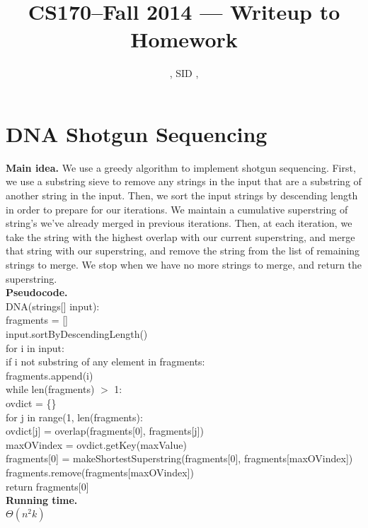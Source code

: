 \documentclass[11pt]{article}
\title{CS170--Fall 2014 --- Writeup to Homework \Homework}
\author{\Name, SID \SID, \texttt{\Login}}
\begin{document}
\maketitle


\section*{DNA Shotgun Sequencing}
\noindent
\textbf{Main idea.}
We use a greedy algorithm to implement shotgun sequencing. First, we use a substring sieve to remove any strings in the input that are a substring of another string in the input. Then, we sort the input strings by descending length in order to prepare for our iterations. We maintain a cumulative superstring of string's we've already merged in previous iterations. Then, at each iteration, we take the string with the highest overlap with our current superstring, and merge that string with our superstring, and remove the string from the list of remaining strings to merge. We stop when we have no more strings to merge, and return the superstring. \\


\noindent
\textbf{Pseudocode.} \\
DNA(strings[] input):\\
\indent fragments = []\\
\indent input.sortByDescendingLength()\\
\indent for i in input:\\
\indent \indent if i not substring of any element in fragments:\\
\indent \indent \indent fragments.append(i)\\
\indent while len(fragments) $>$ 1:\\
\indent \indent ovdict = \{\}\\
\indent \indent for j in range(1, len(fragments):\\
\indent \indent \indent ovdict[j] = overlap(fragments[0], fragments[j])\\
\indent \indent maxOVindex = ovdict.getKey(maxValue)\\
\indent \indent fragments[0] = makeShortestSuperstring(fragments[0], fragments[maxOVindex])\\
\indent \indent fragments.remove(fragments[maxOVindex])\\
\indent return fragments[0]\\

\noindent
\textbf{Running time.}\\
$\Theta(n^2k)$\\
\end{document}
